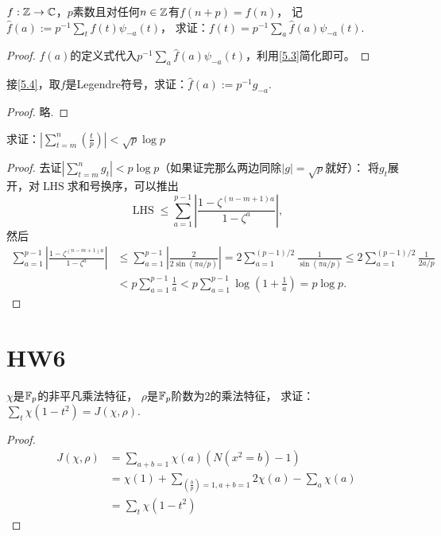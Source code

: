 \begin{exercise}\label{5.4}
    $f:\mathbb{Z}\to\mathbb{C}$，$p$素数且对任何$n\in\mathbb{Z}$有$f(n+p)=f(n)$，
    记$\widehat{f}(a):=p^{-1}\sum_{t}f(t)\psi_{-a}(t)$，
    求证：$f(t)=p^{-1}\sum_{a}\widehat{f}(a)\psi_{-a}(t)$.
\end{exercise}
\begin{proof}
    $\widehat{f}(a)$的定义式代入$p^{-1}\sum_{a}\widehat{f}(a)\psi_{-a}(t)$，利用\ref{5.3}简化即可。
\end{proof}

\begin{exercise}
接\ref{5.4}，取$f$是Legendre符号，求证：$\widehat{f}(a):=p^{-1}g_{-a}$.
\end{exercise}
\begin{proof}
    略.
\end{proof}

\begin{exercise}
    求证：$\displaystyle\left| \sum_{t=m}^{n}\left( \frac{t}{p} \right) \right|<\sqrt{p}\log p$
\end{exercise}
\begin{proof}
    去证$\left| \sum\limits_{t=m}^{n}g_t \right|<p\log p$（如果证完那么两边同除$|g|=\sqrt{p}$就好）：
     将$g_t$展开，对$\operatorname{LHS}$求和号换序，可以推出
     \[\operatorname{LHS}\leqslant\sum_{a=1}^{p-1}
     \left| \frac{1-\zeta^{(n-m+1)a}}{1-\zeta^a}\right|,\]
      然后
    \begin{align*}
        \sum_{a=1}^{p-1}\left| \frac{1-\zeta^{(n-m+1)a}}{1-\zeta^a}\right|
        &\leqslant\sum_{a=1}^{p-1}\left| \frac{2}{2\sin(\pi a/p)} \right|
        =2\sum_{a=1}^{(p-1)/2}\frac{1}{\sin(\pi a/p)}
        \leqslant2\sum_{a=1}^{(p-1)/2}\frac{1}{2a/p}\\
        &<p\sum_{a=1}^{p-1}\frac{1}{a}
        <p\sum_{a=1}^{p-1}\log\left(1+\frac{1}{a}\right)=p\log p.
    \end{align*}
\end{proof}

\section{HW6}

\begin{exercise}\label{6.1}
    $\chi$是$\mathbb{F}_p$的非平凡乘法特征，
    $\rho$是$\mathbb{F}_p$阶数为$2$的乘法特征，
    求证：$\sum_{t}\chi(1-t^2)=J(\chi,\rho)$.
\end{exercise}
\begin{proof}
    \begin{align*}
        J(\chi,\rho)&=\sum_{a+b=1}\chi(a)(N(x^2=b)-1)\\
        &=\chi(1)+\sum_{\left( \frac{b}{p} \right)=1,a+b=1}2\chi(a)-\sum_{a}\chi(a)\\
        &=\sum_{t}\chi(1-t^2)
    \end{align*}
\end{proof}

